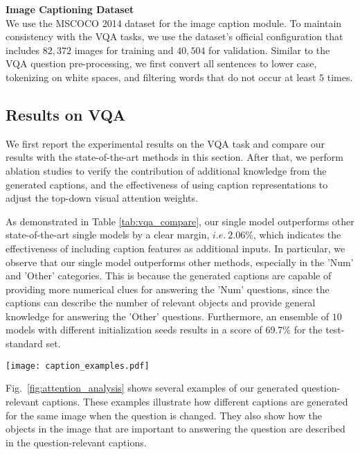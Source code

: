 \documentclass[11pt,a4paper]{article}
\begin{document}
\noindent\textbf{Image Captioning Dataset}\\
We use the MSCOCO 2014 dataset \cite{chen2015microsoft} for the image caption module. To maintain consistency with the VQA tasks, we use the dataset's official configuration that includes $82,372$ images for training and $40,504$ for validation. 
Similar to the VQA question pre-processing, we first convert all sentences to lower case, tokenizing on white spaces, and filtering words that do not occur at least $5$ times. 

\subsection{Results on VQA}
We first report the experimental results on the VQA task and compare our results with the state-of-the-art methods in this section. After that, we perform ablation studies to verify the contribution of additional knowledge from the generated captions, and the effectiveness of using caption representations to adjust the top-down visual attention weights. 

As demonstrated in Table \ref{tab:vqa_compare}, our single model outperforms other state-of-the-art single models by a clear margin, $i.e.\ 2.06\%$, which indicates the effectiveness of including caption features as additional inputs. In particular, we observe that our single model outperforms other methods, especially in the 'Num' and 'Other' categories. This is because the generated captions are capable of providing more numerical clues for answering the 'Num' questions, since the captions can describe the number of relevant objects and provide general knowledge for answering the 'Other' questions. Furthermore, an ensemble of $10$ models with different initialization seeds results in a score of 69.7\% for the test-standard set.
\begin{figure*}[!t]
\centering
\texttt{[image: caption\_examples.pdf]}
\caption{Examples of our generated question-relevant captions. The influential objects with attention weights greater than 0.1 are indicated by bounding boxes (annotated with their visual attention weights in the blue box), and the gray-scale levels in the caption words indicate the word attentions from the caption embedding module.}
\label{fig:attention_analysis}
\end{figure*}

Fig.\ \ref{fig:attention_analysis} shows several examples of our generated question-relevant captions. These examples illustrate how different captions are generated for the same image when the question is changed. They also
show how the objects in the image that are important to answering the question are described in the question-relevant captions.\\
\end{document}
